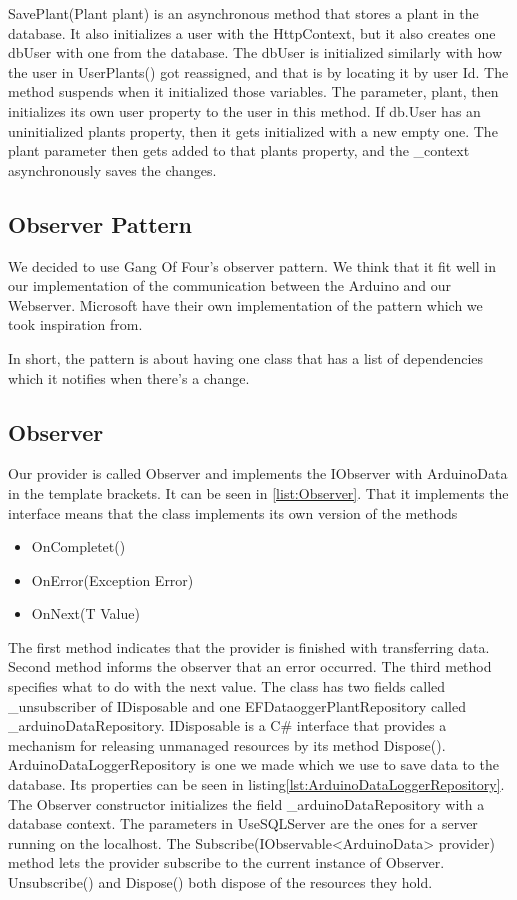 \documentclass[a4paper,12pt,twoside,openright,titlepage]{book}
\begin{document}
SavePlant(Plant plant) is an asynchronous method that stores a plant in the database.  It also initializes a user with the HttpContext, but it also creates one dbUser with one from the database. The dbUser is initialized similarly with how the user in UserPlants() got reassigned, and that is by locating it by user Id. The method suspends when it initialized those variables. The parameter, plant, then initializes its own user property to the user in this method. If db.User has an uninitialized plants property, then it gets initialized with a new empty one. The plant parameter then gets added to that plants property, and the \_context asynchronously saves the changes.
  
\subsection{Observer Pattern}
We decided to use Gang Of Four's observer pattern\cite{GoF}. We think that it fit well in our implementation of the communication between the Arduino and our Webserver. Microsoft have their own implementation of the pattern\cite{MicrosoftObserver} which we took inspiration from.
 
In short, the pattern is about having one class that has a list of dependencies which it notifies when there's a change.

\subsection{Observer}
Our provider is called Observer and implements the IObserver with ArduinoData in the template brackets. It can be seen in \ref{list:Observer}. That it implements the interface means that the class implements its own version of the methods
\begin{itemize}
\item OnCompletet()
\item OnError(Exception Error)
\item OnNext(T Value)
\end{itemize}

The first method indicates that the provider is finished with transferring data. Second method informs the observer that an error occurred. The third method specifies what to do with the next value.
The class has two fields called \_unsubscriber of IDisposable and one EFDataoggerPlantRepository called \_arduinoDataRepository. IDisposable is a C\# interface that provides a mechanism for releasing unmanaged resources by its method Dispose(). ArduinoDataLoggerRepository is one we made which we use to save data to the database. Its properties can be seen in listing\ref{lst:ArduinoDataLoggerRepository}. The Observer constructor initializes the field \_arduinoDataRepository with a database context. The parameters in UseSQLServer are the ones for a server running on the localhost. The Subscribe(IObservable<ArduinoData> provider) method lets the provider subscribe to the current instance of Observer. Unsubscribe() and Dispose() both dispose of the resources they hold. 
\end{document}
